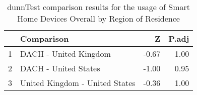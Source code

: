 \begin{table}[ht]
\centering
\begin{tabular}{rlrr}
  \hline
 & Comparison & Z & P.adj \\ 
  \hline
1 & DACH - United Kingdom & -0.67 & 1.00 \\ 
  2 & DACH - United States & -1.00 & 0.95 \\ 
  3 & United Kingdom - United States & -0.36 & 1.00 \\ 
   \hline
\end{tabular}
\caption{dunnTest comparison results for the usage of Smart Home Devices Overall by Region of Residence} 
\end{table}
